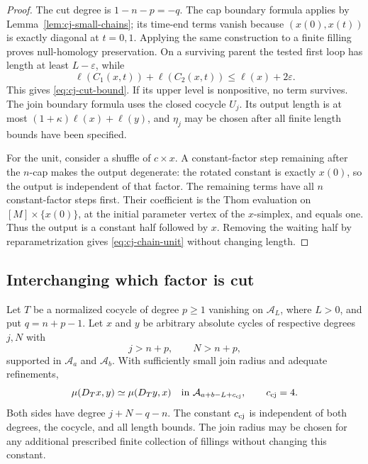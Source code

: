 \begin{proof}
The cut degree is $1-n-p=-q$.  The cap boundary formula applies
by Lemma~\ref{lem:cj-small-chains}; its time-end terms vanish
because $(x(0),x(t))$ is exactly diagonal at $t=0,1$.  Applying
the same construction to a finite filling proves null-homology
preservation.  On a surviving parent the tested first loop has
length at least $L-\varepsilon$, while
\[
 \ell(C_1(x,t))+\ell(C_2(x,t))
 \le\ell(x)+2\varepsilon.
\]
This gives \eqref{eq:cj-cut-bound}.  If its upper level is
nonpositive, no term survives.  The join boundary formula uses
the closed cocycle $U_j$.  Its output length is at most
$(1+\kappa)\ell(x)+\ell(y)$, and $\eta_j$ may be chosen
after all finite length bounds have been specified.

For the unit, consider a shuffle of $c\times x$.  A constant-factor
step remaining after the $n$-cap makes the output degenerate:
the rotated constant is exactly $x(0)$, so the output is independent
of that factor.  The remaining terms have all $n$ constant-factor
steps first.  Their coefficient is the Thom evaluation on
$[M]\times\{x(0)\}$, at the initial parameter vertex of the
$x$-simplex, and equals one.  Thus the output is a constant half
followed by $x$.  Removing the waiting half by reparametrization
gives \eqref{eq:cj-chain-unit} without changing length.
\end{proof}

\subsection{Interchanging which factor is cut}

\begin{theorem}\label{thm:filtered-interchange}
Let $T$ be a normalized cocycle of degree $p\ge1$ vanishing on
$\mathcal A_L$, where $L>0$, and put $q=n+p-1$.  Let $x$ and $y$ be
arbitrary absolute cycles of respective degrees $j,N$ with
\[
 j>n+p,\qquad N>n+p,
\]
supported in $\mathcal A_a$ and $\mathcal A_b$.  With sufficiently small join radius
and adequate refinements,
\begin{equation}\label{eq:cj-interchange}
 \mu(D_Tx,y)\simeq\mu(D_Ty,x)
 \quad\text{in }\mathcal A_{a+b-L+c_{\rm cj}},\qquad c_{\rm cj}=4.
\end{equation}
Both sides have degree $j+N-q-n$.  The constant $c_{\rm cj}$
is independent of both degrees, the cocycle, and all length bounds.
The join radius may be chosen for any additional prescribed finite
collection of fillings without changing this constant.
\end{theorem}

